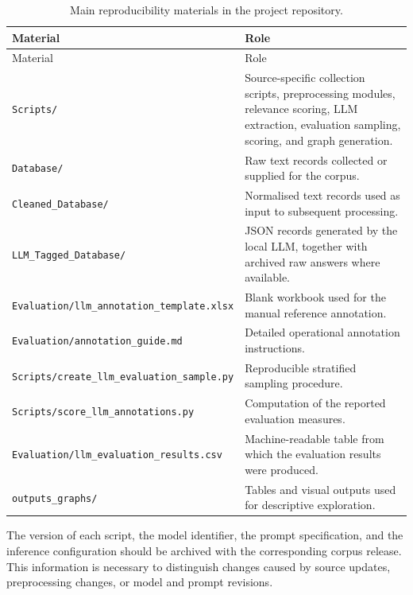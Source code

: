 \begin{longtable}{p{4.5cm}p{9.5cm}}
\caption{Main reproducibility materials in the project repository.}
\label{tab:appendix-materials}\\
\toprule
Material & Role \\
\midrule
\endfirsthead
\toprule
Material & Role \\
\midrule
\endhead
\bottomrule
\endfoot
\texttt{Scripts/} & Source-specific collection scripts, preprocessing modules, relevance scoring, LLM extraction, evaluation sampling, scoring, and graph generation. \\
\texttt{Database/} & Raw text records collected or supplied for the corpus. \\
\texttt{Cleaned\_Database/} & Normalised text records used as input to subsequent processing. \\
\texttt{LLM\_Tagged\_Database/} & JSON records generated by the local LLM, together with archived raw answers where available. \\
\texttt{Evaluation/llm\_annotation\_template.xlsx} & Blank workbook used for the manual reference annotation. \\
\texttt{Evaluation/annotation\_guide.md} & Detailed operational annotation instructions. \\
\texttt{Scripts/create\_llm\_evaluation\_sample.py} & Reproducible stratified sampling procedure. \\
\texttt{Scripts/score\_llm\_annotations.py} & Computation of the reported evaluation measures. \\
\texttt{Evaluation/llm\_evaluation\_results.csv} & Machine-readable table from which the evaluation results were produced. \\
\texttt{outputs\_graphs/} & Tables and visual outputs used for descriptive exploration. \\
\end{longtable}

The version of each script, the model identifier, the prompt specification, and
the inference configuration should be archived with the corresponding corpus
release. This information is necessary to distinguish changes caused by source
updates, preprocessing changes, or model and prompt revisions.
